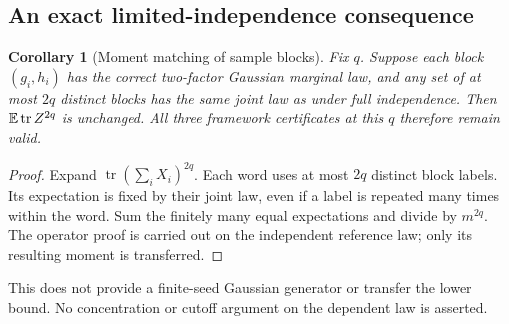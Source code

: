 \documentclass[11pt]{article}
\numberwithin{equation}{section}
\newtheorem{corollary}[theorem]{Corollary}
\theoremstyle{definition}\newtheorem{definition}[theorem]{Definition}
\theoremstyle{remark}\newtheorem{remark}[theorem]{Remark}
\newcommand{\tr}{\operatorname{tr}}\newcommand{\Ent}{\operatorname{Ent}}
\begin{document}
\subsection{An exact limited-independence consequence}
\begin{corollary}[Moment matching of sample blocks]\label{cor:limited}
Fix $q$. Suppose each block $(g_i,h_i)$ has the correct two-factor Gaussian
marginal law, and any set of at most $2q$ distinct blocks has the same joint law
as under full independence. Then $\E\tr Z^{2q}$ is unchanged. All three
framework certificates at this $q$ therefore remain valid.
\end{corollary}
\begin{proof}
Expand $\tr(\sum_iX_i)^{2q}$. Each word uses at most $2q$ distinct block labels.
Its expectation is fixed by their joint law, even if a label is repeated many
times within the word. Sum the finitely many equal expectations and divide by
$m^{2q}$. The operator proof is carried out on the independent reference law;
only its resulting moment is transferred.
\end{proof}
This does not provide a finite-seed Gaussian generator or transfer the lower
bound. No concentration or cutoff argument on the dependent law is asserted.
\end{document}

